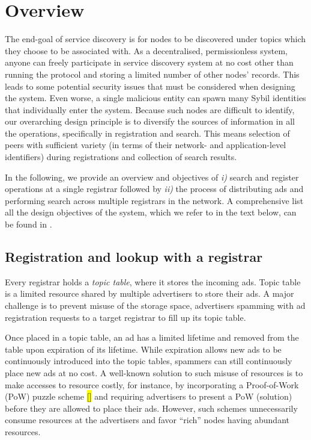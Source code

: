 
\section{Overview}

The end-goal of service discovery is for nodes to be discovered under topics which they choose to be associated with. As a decentralised, permissionless system, anyone can freely participate in service discovery system at no cost other than running the protocol and storing a limited number of other nodes' records. This leads to some potential security issues that must be considered when designing the system. Even worse, a single malicious entity can spawn many Sybil identities that individually enter the system. Because such nodes are difficult to identify, our overarching design principle is to diversify the sources of information in all the operations, specifically in registration and search. This means selection of peers with sufficient variety (in terms of their network- and application-level identifiers) during registrations and collection of search results. 

In the following, we provide an overview and objectives of \textit{i)} search and register operations at a single registrar followed by \textit{ii)} the process of distributing ads and performing search across multiple registrars in the network. A comprehensive list all the design objectives of the system, which we refer to in the text below, can be found in .

\subsection{Registration and lookup with a registrar}

Every registrar holds a \emph{topic table}, where it stores the incoming ads. Topic table is a limited resource shared by multiple advertisers to store their ads. A major challenge is to prevent misuse of the storage space, \eg advertisers spamming with ad registration requests to a target registrar to fill up its topic table.

Once placed in a topic table, an ad has a limited lifetime and removed from the table upon expiration of its lifetime. While expiration allows new ads to be continuously introduced into the topic tables, spammers can still continuously place new ads at no cost. A well-known solution to such misuse of resources is to make accesses to resource costly, for instance, by incorporating a Proof-of-Work (PoW) puzzle scheme \hl{[]} and requiring advertisers to present a PoW (\ie solution) before they are allowed to place their ads. However, such schemes unnecessarily consume resources at the advertisers and favor ``rich'' nodes having abundant resources. 

